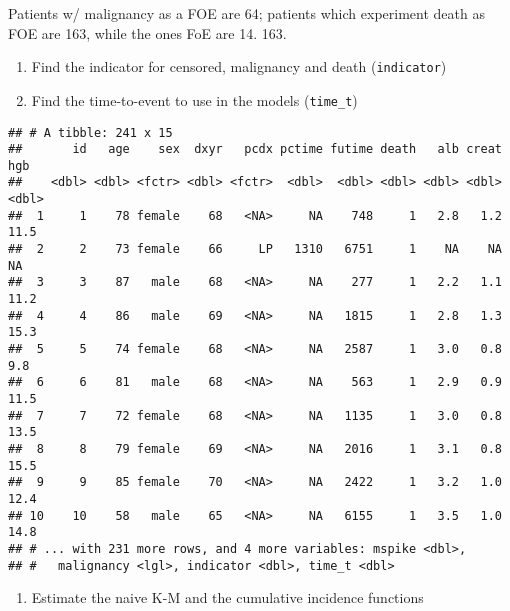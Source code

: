 \documentclass[]{book}
\newenvironment{Shaded}{\begin{snugshade}}{\end{snugshade}}
\newcommand{\KeywordTok}[1]{\textcolor[rgb]{0.13,0.29,0.53}{\textbf{{#1}}}}
\newcommand{\DataTypeTok}[1]{\textcolor[rgb]{0.13,0.29,0.53}{{#1}}}
\newcommand{\DecValTok}[1]{\textcolor[rgb]{0.00,0.00,0.81}{{#1}}}
\newcommand{\StringTok}[1]{\textcolor[rgb]{0.31,0.60,0.02}{{#1}}}
\newcommand{\OtherTok}[1]{\textcolor[rgb]{0.56,0.35,0.01}{{#1}}}
\newcommand{\NormalTok}[1]{{#1}}
\providecommand{\tightlist}{%
  \setlength{\itemsep}{0pt}\setlength{\parskip}{0pt}}
\theoremstyle{definition}
\theoremstyle{definition}
\theoremstyle{definition}
\theoremstyle{remark}
\begin{document}
Patients w/ malignancy as a FOE are 64; patients which experiment death
as FOE are 163, while the ones FoE are 14. 163.

\begin{enumerate}
\def\labelenumi{\arabic{enumi}.}
\setcounter{enumi}{1}
\tightlist
\item
  Find the indicator for censored, malignancy and death
  (\texttt{indicator})
\item
  Find the time-to-event to use in the models (\texttt{time\_t})
\end{enumerate}

\begin{Shaded}
\end{Shaded}

\begin{verbatim}
## # A tibble: 241 x 15
##       id   age    sex  dxyr   pcdx pctime futime death   alb creat   hgb
##    <dbl> <dbl> <fctr> <dbl> <fctr>  <dbl>  <dbl> <dbl> <dbl> <dbl> <dbl>
##  1     1    78 female    68   <NA>     NA    748     1   2.8   1.2  11.5
##  2     2    73 female    66     LP   1310   6751     1    NA    NA    NA
##  3     3    87   male    68   <NA>     NA    277     1   2.2   1.1  11.2
##  4     4    86   male    69   <NA>     NA   1815     1   2.8   1.3  15.3
##  5     5    74 female    68   <NA>     NA   2587     1   3.0   0.8   9.8
##  6     6    81   male    68   <NA>     NA    563     1   2.9   0.9  11.5
##  7     7    72 female    68   <NA>     NA   1135     1   3.0   0.8  13.5
##  8     8    79 female    69   <NA>     NA   2016     1   3.1   0.8  15.5
##  9     9    85 female    70   <NA>     NA   2422     1   3.2   1.0  12.4
## 10    10    58   male    65   <NA>     NA   6155     1   3.5   1.0  14.8
## # ... with 231 more rows, and 4 more variables: mspike <dbl>,
## #   malignancy <lgl>, indicator <dbl>, time_t <dbl>
\end{verbatim}

\begin{enumerate}
\def\labelenumi{\arabic{enumi}.}
\setcounter{enumi}{3}
\tightlist
\item
  Estimate the naive K-M and the cumulative incidence functions
\end{enumerate}
\end{document}
